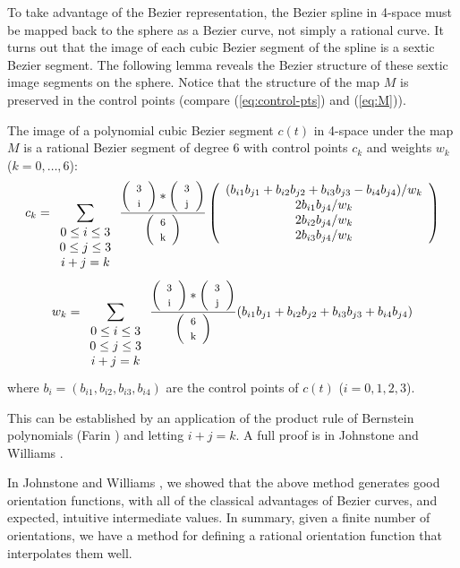 To take advantage of the Bezier representation,
the Bezier spline in 4-space must be mapped back to the sphere
as a Bezier curve, not simply a rational curve.
It turns out that the image of each cubic Bezier segment of the spline
is a sextic Bezier segment.
The following lemma reveals the Bezier structure of these sextic
image segments on the sphere.
Notice that the structure of the map $M$ is preserved in the control
points (compare (\ref{eq:control-pts}) and (\ref{eq:M})).

\begin{lemma}
\label{sextic}
The image of a polynomial cubic Bezier segment $c(t)$ in 4-space 
under the map $M$
is a rational Bezier segment of degree 6 with control points $c_k$
and weights $w_k$ ($k = 0, \ldots, 6$):
\begin{equation}
\label{eq:control-pts}
c_k = \sum_{\begin{array}{c} 0 \leq i \leq 3 \\ 
			     0 \leq j \leq 3 \\ 
			     i+j=k
			     \end{array}} 
        \frac{\left( \begin{array}{c} \mbox{\footnotesize{3}} \\ \mbox{\footnotesize{i}} \end{array} \right) * \left( \begin{array}{c} \mbox{\footnotesize{3}} \\ \mbox{\footnotesize{j}} \end{array} \right)}{\left( \begin{array}{c} \mbox{\footnotesize{6}} \\ \mbox{\footnotesize{k}} \end{array} \right)}
	\left( \begin{array}{c}
            (b_{i1} b_{j1} + b_{i2} b_{j2} + b_{i3} b_{j3} - b_{i4} b_{j4}) / w_k \\
            2b_{i1} b_{j4} / w_k \\
            2b_{i2} b_{j4} / w_k \\
            2b_{i3} b_{j4} / w_k
	\end{array} \right)
\end{equation}
\begin{equation}
w_k = \sum_{\begin{array}{c} 0 \leq i \leq 3 \\ 
			     0 \leq j \leq 3 \\ 
			     i+j=k
			     \end{array}}
        \frac{\left( \begin{array}{c} \mbox{\footnotesize{3}} \\ \mbox{\footnotesize{i}} \end{array} \right) * \left( \begin{array}{c} \mbox{\footnotesize{3}} \\ \mbox{\footnotesize{j}} \end{array} \right)}{\left( \begin{array}{c} \mbox{\footnotesize{6}} \\ \mbox{\footnotesize{k}} \end{array} \right)}
	(b_{i1} b_{j1} + b_{i2} b_{j2} + b_{i3} b_{j3} + b_{i4} b_{j4})
\end{equation}
where $b_i = (b_{i1},b_{i2},b_{i3},b_{i4})$ are the control points of $c(t)$
($i=0,1,2,3$).
\end{lemma}
\prf
This can be established by an application of the product rule
of Bernstein polynomials (Farin \cite{farin93})
and letting $i+j=k$.
A full proof is in Johnstone and Williams \cite{jjjimbo94a}.
\QED

In Johnstone and Williams \cite{jjjimbo94a}, we showed that the above
method generates good orientation functions, with all of the classical
advantages of Bezier curves, and expected, intuitive intermediate values.
In summary, given a finite number of orientations, we have a method
for defining a rational orientation function that interpolates them well.


